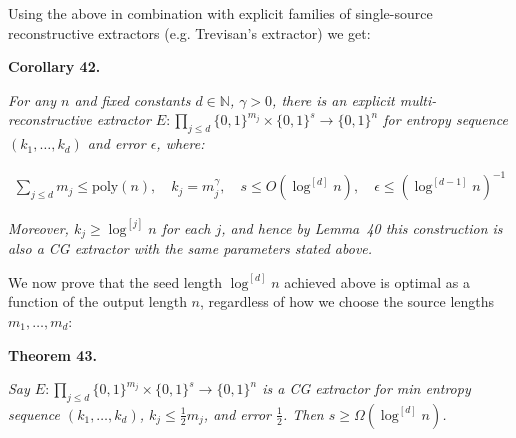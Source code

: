 Using the above in combination with explicit families of single-source reconstructive extractors (e.g. Trevisan’s extractor) we get:\par





\par\medskip\noindent\textbf{
\textbf{Corollary 42}\textbf{.}
}\par



\emph{For any $n$ and fixed constants $d\in\mathbb{N}$, $\gamma>0$, there is an explicit multi-reconstructive extractor $E:\prod_{j\leq d}\{0,1\}^{m_{j}}\times\{0,1\}^{s}\to\{0,1\}^{n}$ for entropy sequence $(k_{1},\ldots,k_{d})$ and error $\epsilon$, where:}\par


\[\begin{gathered}
\sum_{j\leq d}m_{j}\leq\mathrm{poly}(n),\quad k_{j}=m_{j}^{\gamma},\quad s\leq
O(\log^{[d]}n),\quad\epsilon\leq(\log^{[d-1]}n)^{-1}
\end{gathered}\]


\emph{Moreover, $k_{j}\geq\log^{[j]}n$ for each $j$, and hence by Lemma 40 this construction is also a CG extractor with the same parameters stated above.}\par






We now prove that the seed length $\log^{[d]}n$ achieved above is optimal as a function of the output length $n$, regardless of how we choose the source lengths $m_{1},\ldots,m_{d}$:\par





\par\medskip\noindent\textbf{
\textbf{Theorem 43}\textbf{.}
}\par



\emph{Say $E:\prod_{j\leq d}\{0,1\}^{m_{j}}\times\{0,1\}^{s}\to\{0,1\}^{n}$ is a CG extractor for min entropy sequence $(k_{1},\ldots,k_{d})$, $k_{j}\leq\frac{1}{2}m_{j}$, and error $\frac{1}{2}$. Then $s\geq\Omega(\log^{[d]}n)$.}\par






